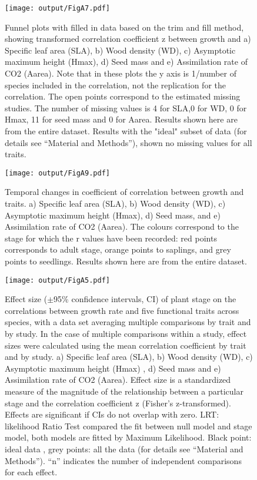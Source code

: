 \documentclass[10pt,twoside]{article}\usepackage[]{graphicx}\usepackage[]{color}
\begin{document}
\begin{figure}[h!]
\centering
\texttt{[image: output/FigA7.pdf]}
\caption{Funnel plots with filled in data based on the trim and fill method, showing transformed correlation coefficient z between growth and a) Specific leaf area (SLA), b) Wood density (WD), c) Asymptotic maximum height (Hmax), d) Seed mass and e) Assimilation rate of CO2 (Aarea). Note that in these plots the y axis is 1/number of species included in the correlation, not the replication for the correlation. The open points correspond to the estimated missing studies. The number of missing values is 4 for SLA,0 for WD, 0 for Hmax, 11 for seed mass and 0 for Aarea. Results shown here are from the entire dataset. Results with the "ideal" subset of data (for details see ``Material and Methods''), shown no missing values for all traits.}
\label{fig:figA7}
\end{figure}


\begin{figure}[h!]
\centering
\texttt{[image: output/FigA9.pdf]}
\caption{Temporal changes in coefficient of correlation between growth and traits. a) Specific leaf area (SLA), b) Wood density (WD), c) Asymptotic maximum height (Hmax), d) Seed mass, and e) Assimilation rate of CO2 (Aarea). The colours correspond to the stage for which the r values have been recorded: red points corresponds to adult stage, orange points to saplings, and grey points to seedlings. Results shown here are from the entire dataset.}
\label{fig:figA9}
\end{figure}


\begin{figure}[h!]
\centering
\texttt{[image: output/FigA5.pdf]}
\caption{Effect size ($\pm$95\% confidence intervals, CI) of plant stage on the correlations between growth rate and five functional traits across species, with a data set averaging multiple comparisons by trait and by study. In the case of multiple comparisons within a study, effect sizes were calculated using the mean correlation coefficient by trait and by study. a) Specific leaf area (SLA), b) Wood density (WD), c) Asymptotic maximum height (Hmax) , d) Seed mass and e) Assimilation rate of CO2 (Aarea). Effect size is a standardized measure of the magnitude of the relationship between a particular stage and the correlation coefficient z (Fisher's z-transformed). Effects are significant if CIs do not overlap with zero. LRT: likelihood Ratio Test compared the fit between null model and stage model, both models are fitted by Maximum Likelihood. Black point: ideal data , grey points: all the data (for details see ``Material and Methods''). ``n'' indicates the number of independent comparisons for each effect.}
\label{fig:figA5}
\end{figure}
\end{document}
